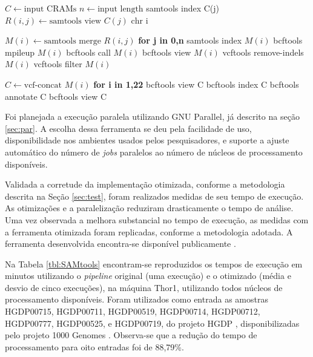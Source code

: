 \documentclass[cic,tc]{iiufrgs}
\begin{document}
\begin{algorithmic}
  \State $C \gets \text{input CRAMs}$
  \State $n \gets \text{input length}$
  \State samtools index C(j)
    \State $R(i,j) \gets \text{samtools view } C(j) \text{ chr i}$
  \EndFor
\EndFor

  \State $M(i) \gets \text{samtools merge } R(i,j)$ \textbf{for j in 0,n}
  \State samtools index $M(i)$
  \State bcftools mpileup $M(i)$
  \State bcftools call $M(i)$
  \State bcftools view $M(i)$
  \State vcftools remove-indels $M(i)$
  \State vcftools filter $M(i)$
\EndFor

\State $C \gets \text{vcf-concat } M(i)$ \textbf{for i in 1,22}
\State bcftools view C
\State bcftools index C
\State bcftools annotate C
\State bcftools view C
\end{algorithmic}

Foi planejada a execução paralela utilizando GNU Parallel, já descrito na seção
\ref{sec:par}. A escolha dessa ferramenta se deu pela facilidade de uso,
disponibilidade nos ambientes usados pelos pesquisadores, e suporte a ajuste
automático do número de \textit{jobs} paralelos ao número de núcleos de
processamento disponíveis. 

Validada a corretude da implementação otimizada, conforme a metodologia
descrita na Seção \ref{sec:test}, foram realizados medidas de seu tempo de
execução. As otimizações e a paralelização reduziram drasticamente o tempo de
análise. Uma vez observada a melhora substancial no tempo de execução, as
medidas com a ferramenta otimizada foram replicadas, conforme a metodologia
adotada. A ferramenta desenvolvida encontra-se disponível publicamente \cite{parsnv}.

Na Tabela \ref{tbl:SAMtools} encontram-se reproduzidos os tempos de execução em
minutos utilizando o \textit{pipeline} original (uma execução) e o otimizado
(média e desvio de cinco execuções), na máquina Thor1, utilizando todos núcleos
de processamento disponíveis. Foram utilizados como entrada as amostras
HGDP00715, HGDP00711, HGDP00519, HGDP00714, HGDP00712, HGDP00777, HGDP00525, e
HGDP00719, do projeto HGDP \cite{cavalli2005human}, disponibilizadas pelo
projeto 1000 Genomes \cite{via20101000}. Observa-se que a redução do tempo de
processamento para oito entradas foi de 88,79\%.
\end{document}
